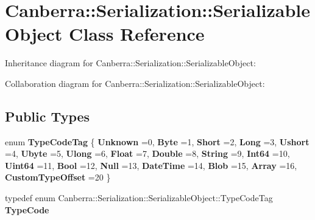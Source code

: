 \hypertarget{class_canberra_1_1_serialization_1_1_serializable_object}{}\section{Canberra\+:\+:Serialization\+:\+:Serializable\+Object Class Reference}
\label{class_canberra_1_1_serialization_1_1_serializable_object}


Inheritance diagram for Canberra\+:\+:Serialization\+:\+:Serializable\+Object\+:


Collaboration diagram for Canberra\+:\+:Serialization\+:\+:Serializable\+Object\+:
\subsection*{Public Types}
\begin{DoxyCompactItemize}
\item 
\mbox{\label{class_canberra_1_1_serialization_1_1_serializable_object_a1ef23dd76e79aefac5c609181beb5430}} 
enum {\bfseries Type\+Code\+Tag} \{ \newline
{\bfseries Unknown} =0, 
{\bfseries Byte} =1, 
{\bfseries Short} =2, 
{\bfseries Long} =3, 
\newline
{\bfseries Ushort} =4, 
{\bfseries Ubyte} =5, 
{\bfseries Ulong} =6, 
{\bfseries Float} =7, 
\newline
{\bfseries Double} =8, 
{\bfseries String} =9, 
{\bfseries Int64} =10, 
{\bfseries Uint64} =11, 
\newline
{\bfseries Bool} =12, 
{\bfseries Null} =13, 
{\bfseries Date\+Time} =14, 
{\bfseries Blob} =15, 
\newline
{\bfseries Array} =16, 
{\bfseries Custom\+Type\+Offset} =20
 \}
\item 
\mbox{\label{class_canberra_1_1_serialization_1_1_serializable_object_a163e11a5f23b834ce8544f494084045e}} 
typedef enum Canberra\+::\+Serialization\+::\+Serializable\+Object\+::\+Type\+Code\+Tag {\bfseries Type\+Code}
\end{DoxyCompactItemize}
